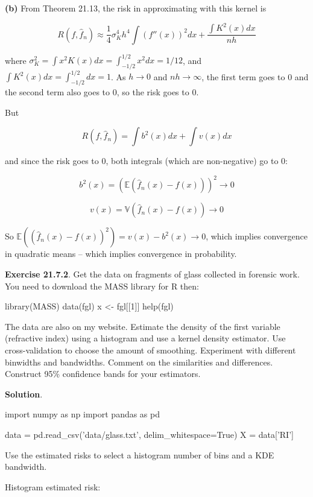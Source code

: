 \textbf{(b)} From Theorem 21.13, the risk in approximating with this
kernel is

\[ R(f, \hat{f}_{n}) \approx \frac{1}{4} \sigma_K^{4} h^{4} \int (f''(x))^{2} dx + \frac{\int K^{2}(x)dx}{nh} \]

where
\(\sigma_K^{2} = \int x^{2} K(x) dx = \int_{-1/2}^{1/2} x^{2} dx = 1/12\), and
\(\int K^{2}(x) dx = \int_{-1/2}^{1/2} dx = 1\). As \(h \rightarrow 0\)
and \(nh \rightarrow \infty\), the first term goes to 0 and the second
term also goes to 0, so the risk goes to 0.

But

\[ R(f, \hat{f}_{n}) = \int b^{2}(x) dx + \int v(x) dx \]

and since the risk goes to 0, both integrals (which are non-negative) go
to 0:

\[ b^{2}(x) = (\mathbb{E}(\hat{f}_{n}(x) - f(x)))^{2} \rightarrow 0\]

\[ v(x) = \mathbb{V}(\hat{f}_{n}(x) - f(x)) \rightarrow 0\]

So
\(\mathbb{E}((\hat{f}_{n}(x) - f(x))^{2}) = v(x) - b^{2}(x) \rightarrow 0\),
which implies convergence in quadratic means -- which implies
convergence in probability.

\textbf{Exercise 21.7.2}. Get the data on fragments of glass collected
in forensic work. You need to download the MASS library for R then:

\begin{console}
library(MASS)
data(fgl)
x <- fgl[[1]]
help(fgl)
\end{console}

The data are also on my website. Estimate the density of the first
variable (refractive index) using a histogram and use a kernel density
estimator. Use cross-validation to choose the amount of smoothing.
Experiment with different binwidths and bandwidths. Comment on the
similarities and differences. Construct 95\% confidence bands for your
estimators.

\textbf{Solution}.

\begin{python}
import numpy as np
import pandas as pd

data = pd.read_csv('data/glass.txt', delim_whitespace=True)
X = data['RI']
\end{python}

Use the estimated risks to select a histogram number of bins and a
KDE bandwidth.

Histogram estimated risk:

